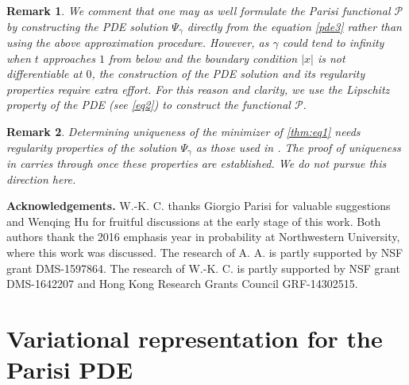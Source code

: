 \documentclass[12pt]{article}
\newtheorem{remark}{\bf Remark}
\newenvironment{Proof of lemma}{\noindent{\bf Proof of Lemma}}{\hfill$\Box$\newline}
\newenvironment{Proof of theorem}{\noindent{\bf Proof of Theorem}}{\hfill{\footnotesize${\square}$}\newline}
\newenvironment{Proof of theorems}{\noindent{\bf Proof of Theorems}}{\hfill$\Box$\newline}
\newenvironment{Proof of proposition}{\noindent{\bf Proof of Proposition}}{\hfill$\Box$\newline}
\newenvironment{Proof of propositions}{\noindent{\bf Proof of Propositions}}{\hfill$\Box$\newline}
\newenvironment{Proof of exercise}{\noindent{\it Proof of Exercise:}}{\hfill$\Box$}
\begin{document}
\begin{remark} \rm We comment that one may as well formulate the Parisi functional $\mathcal{P}$ by constructing the PDE solution $\Psi_\gamma$ directly from the equation \eqref{pde3} rather than using the  above approximation procedure. However, as $\gamma$ could tend to infinity when $t$ approaches $1$ from below and the boundary condition $|x|$ is not differentiable at $0$, the construction of the PDE solution and its regularity properties require extra effort. For this reason and clarity, we use the Lipschitz property  of the PDE  (see \eqref{eq2}) to construct the functional $\mathcal{P}$.
\end{remark}

\begin{remark} \rm
Determining uniqueness of the minimizer of \eqref{thm:eq1} needs regularity properties of the solution $\Psi_\gamma$ as those used in \cite{AC14}. The proof of uniqueness in \cite{AC14} carries through once these properties are established. We do not pursue this direction here.
\end{remark}

\smallskip
\smallskip
\smallskip

{\noindent \bf Acknowledgements.} W.-K. C. thanks Giorgio Parisi for valuable suggestions and Wenqing Hu for fruitful discussions at the early stage of this work. Both authors thank the 2016 emphasis year in probability at  Northwestern University, where this work was discussed. The research of A. A. is partly supported by NSF grant DMS-1597864. The research of W.-K. C. is partly supported by NSF grant DMS-1642207 and Hong Kong Research Grants Council GRF-14302515. 

	
	
\section{Variational representation for the Parisi PDE}	
\end{document}
